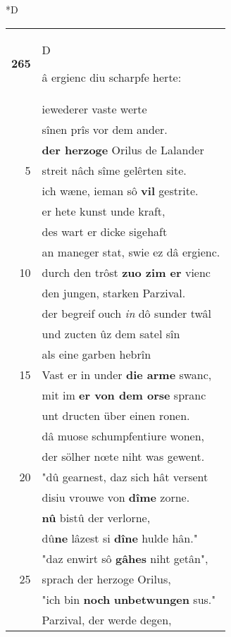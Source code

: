 \documentclass[8pt,a4paper,notitlepage]{article}
\begin{document}
\begin{table}[ht]
\begin{minipage}[t]{0.5\linewidth}
\small
\begin{center}*D
\end{center}
\begin{tabular}{rl}
\textbf{265} & \begin{large}D\end{large}â ergienc diu scharpfe herte:\\ 
 & iewederer vaste werte\\ 
 & sînen prîs vor dem ander.\\ 
 & \textbf{der herzoge} Orilus de Lalander\\ 
5 & streit nâch sîme gelêrten site.\\ 
 & ich wæne, ieman sô \textbf{vil} gestrite.\\ 
 & er hete kunst unde kraft,\\ 
 & des wart er dicke sigehaft\\ 
 & an maneger stat, swie ez dâ ergienc.\\ 
10 & durch den trôst \textbf{zuo zim er} vienc\\ 
 & den jungen, starken Parzival.\\ 
 & der begreif ouch \textit{in} dô sunder twâl\\ 
 & und zucten ûz dem satel sîn\\ 
 & als eine garben hebrîn\\ 
15 & Vast er in under \textbf{die arme} swanc,\\ 
 & mit im \textbf{er von dem orse} spranc\\ 
 & unt dructen über einen ronen.\\ 
 & dâ muose schumpfentiure wonen,\\ 
 & der sölher nœte niht was gewent.\\ 
20 & "dû gearnest, daz sich hât versent\\ 
 & disiu vrouwe von \textbf{dîme} zorne.\\ 
 & \textbf{nû} bistû der verlorne,\\ 
 & dû\textbf{ne} lâzest si \textbf{dîne} hulde hân."\\ 
 & "daz enwirt sô \textbf{gâhes} niht getân",\\ 
25 & sprach der herzoge Orilus,\\ 
 & "ich bin \textbf{noch} \textbf{unbetwungen} sus."\\ 
 & Parzival, der werde degen,\\ 

\end{tabular}
\end{minipage}
\end{table}
\end{document}
